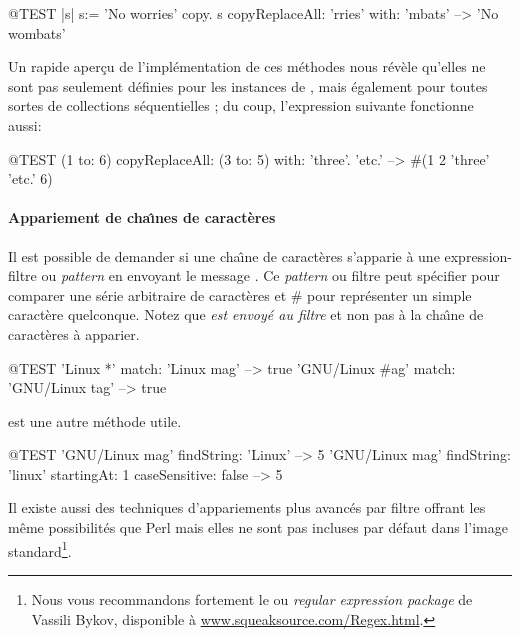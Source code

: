 \documentclass[a4paper,10pt,twoside]{book}
\begin{document}
\begin{code}{@TEST |s| s:= 'No worries' copy.}
s copyReplaceAll: 'rries' with: 'mbats' --> 'No wombats'
\end{code}

Un rapide aper\c{c}u de l'impl\'ementation de ces m\'ethodes nous r\'ev\`ele
qu'elles ne sont pas seulement d\'efinies pour les instances de
, mais également pour toutes sortes de collections 
s\'equentielles ; du coup, l'expression suivante
fonctionne aussi:

\begin{code}{@TEST}
(1 to: 6) copyReplaceAll: (3 to: 5) with: { 'three'. 'etc.' } --> #(1 2 'three' 'etc.' 6)
\end{code}

\paragraph{Appariement de cha\^{\i}nes de caractères}

Il est possible de demander si une cha\^{\i}ne de caract\`eres
s'apparie \`a  une expression-filtre ou \emph{pattern} en
envoyant le message .
Ce \emph{pattern} ou filtre peut sp\'ecifier \ct{*} pour
comparer une s\'erie arbitraire de caract\`eres et \# 
pour repr\'esenter un simple caract\`ere quelconque.
Notez que \emph{ est envoy\'e au filtre} et non pas \`a la cha\^{\i}ne
de caract\`eres \`a apparier.
\begin{code}{@TEST}
'Linux *' match: 'Linux mag'                      --> true
'GNU/Linux #ag' match: 'GNU/Linux tag' --> true
\end{code}

 est une autre m\'ethode utile.
\begin{code}{@TEST}
'GNU/Linux mag' findString: 'Linux'                                                      --> 5
'GNU/Linux mag' findString: 'linux' startingAt: 1 caseSensitive: false  --> 5
\end{code}

Il existe aussi des techniques d'appariements plus avanc\'es par filtre 
offrant les m\^eme possibilit\'es que Perl mais elles ne sont pas incluses
par d\'efaut dans l'image standard\footnote{Nous vous recommandons fortement
le  ou \emph{regular expression package} de Vassili Bykov, disponible \`a \url{www.squeaksource.com/Regex.html}.
}.
\end{document}

